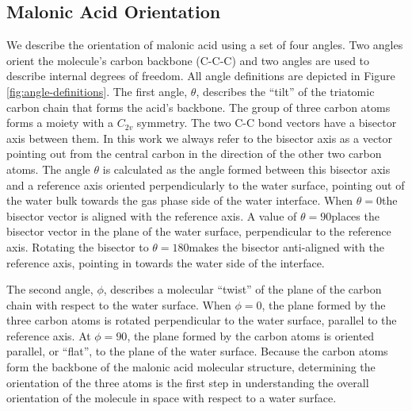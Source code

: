 \subsection{Malonic Acid Orientation}

We describe the orientation of malonic acid using a set of four angles. Two angles orient the molecule's carbon backbone (C-C-C) and two angles are used to describe internal degrees of freedom. All angle definitions are depicted in Figure \ref{fig:angle-definitions}. The first angle, $\theta$, describes the ``tilt'' of the triatomic carbon chain that forms the acid's backbone. The group of three carbon atoms forms a moiety with a $C_{2v}$ symmetry. The two C-C bond vectors have a bisector axis between them. In this work we always refer to the bisector axis as a vector pointing out from the central carbon in the direction of the other two carbon atoms. The angle $\theta$ is calculated as the angle formed between this bisector axis and a reference axis oriented perpendicularly to the water surface, pointing out of the water bulk towards the gas phase side of the water interface. When $\theta = 0$\textdegree the bisector vector is aligned with the reference axis. A value of $\theta=90$\textdegree places the bisector vector in the plane of the water surface, perpendicular to the reference axis. Rotating the bisector to $\theta=180$\textdegree makes the bisector anti-aligned with the reference axis, pointing in towards the water side of the interface.

The second angle, $\phi$, describes a molecular ``twist'' of the plane of the carbon chain with respect to the water surface. When $\phi=0$\textdegree, the plane formed by the three carbon atoms is rotated perpendicular to the water surface, parallel to the reference axis. At $\phi=90$\textdegree, the plane formed by the carbon atoms is oriented parallel, or ``flat'', to the plane of the water surface. Because the carbon atoms form the backbone of the malonic acid molecular structure, determining the orientation of the three atoms is the first step in understanding the overall orientation of the molecule in space with respect to a water surface.

